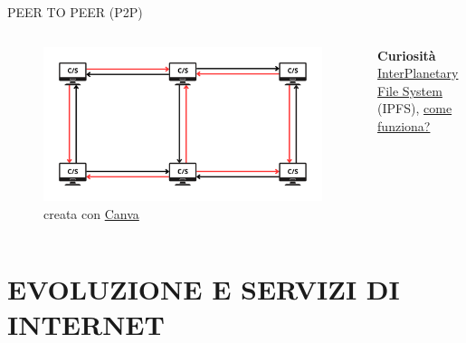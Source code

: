 \documentclass[aspectratio=1610]{beamer}
\begin{document}
\begin{frame}{PEER TO PEER (P2P)}
    \begin{columns}
        \begin{figure}
            \includegraphics[width=\linewidth]{img/p2p.png}
            \caption{{creata con \href{https://www.canva.com/}{Canva}}}
        \end{figure}
        \tiny{
            \textbf{Curiosità}\\
            \href{https://ipfs.tech/}{InterPlanetary File System} (IPFS), 
            \href{https://www.insidemarketing.it/ipfs-come-funziona}{come funziona?}\\
        }
    \end{columns}
\end{frame}

\section{EVOLUZIONE E SERVIZI DI INTERNET}
\end{document}

